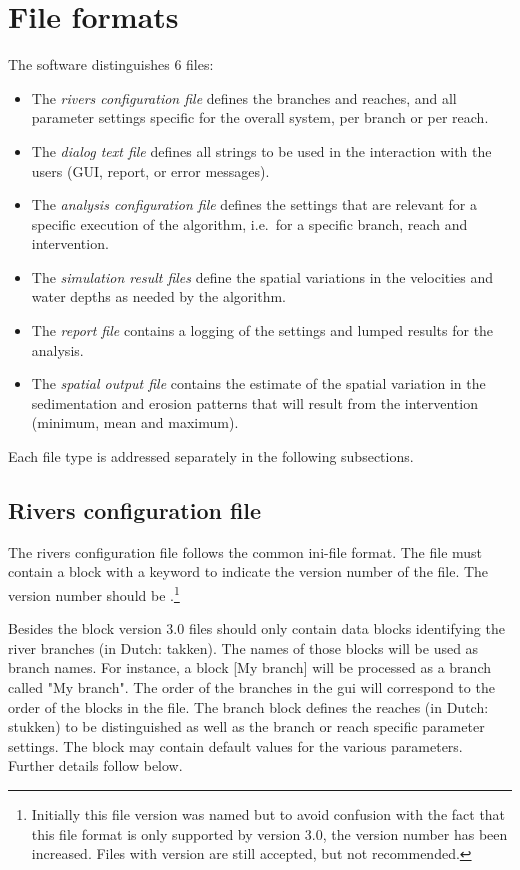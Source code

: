 \chapter{File formats}

The software distinguishes 6 files:

\begin{itemize}
\item The \emph{rivers configuration file} defines the branches and reaches, and all parameter settings specific for the overall system, per branch or per reach.
\item The \emph{dialog text file} defines all strings to be used in the interaction with the users (GUI, report, or error messages).
\item The \emph{analysis configuration file} defines the settings that are relevant for a specific execution of the algorithm, i.e.~for a specific branch, reach and intervention.
\item The \emph{simulation result files} define the spatial variations in the velocities and water depths as needed by the algorithm.
\item The \emph{report file} contains a logging of the settings and lumped results for the analysis.
\item The \emph{spatial output file} contains the estimate of the spatial variation in the sedimentation and erosion patterns that will result from the intervention (minimum, mean and maximum).
\end{itemize}

Each file type is addressed separately in the following subsections.

\section{Rivers configuration file}\label{sec:rivers-config}

The rivers configuration file follows the common ini-file format.
The file must contain a \keyw{[General]} block with a keyword  to indicate the version number of the file.
The version number should be .\footnote{Initially this file version was named  but to avoid confusion with the fact that this file format is only supported by \dfastmi version 3.0, the version number has been increased.
Files with version  are still accepted, but not recommended.}

Besides the \keyw{[General]} block version 3.0 files should only contain data blocks identifying the river branches (in Dutch: takken).
The names of those blocks will be used as branch names.
For instance, a block [My branch] will be processed as a branch called "My branch".
The order of the branches in the gui will correspond to the order of the blocks in the file.
The branch block defines the reaches (in Dutch: stukken) to be distinguished as well as the branch or reach specific parameter settings.
The \keyw{[General]} block may contain default values for the various parameters.
Further details follow below.

